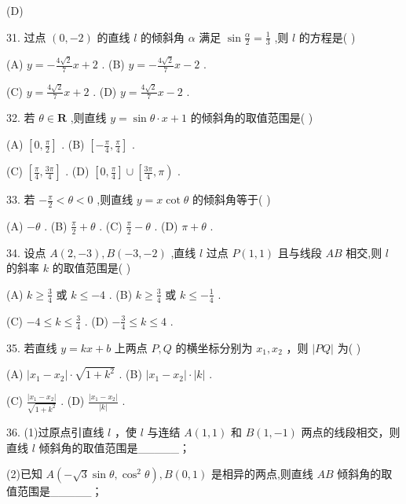 \documentclass[10pt]{article}
\begin{document}
(D)

31. 过点 \(\left( {0, - 2}\right)\) 的直线 \(l\) 的倾斜角 \(\alpha\) 满足 \(\sin \frac{\alpha }{2} = \frac{1}{3}\) ,则 \(l\) 的方程是( )

(A) \(y =  - \frac{4\sqrt{2}}{7}x + 2\) . (B) \(y =  - \frac{4\sqrt{2}}{7}x - 2\) .

(C) \(y = \frac{4\sqrt{2}}{7}x + 2\) . (D) \(y = \frac{4\sqrt{2}}{7}x - 2\) .

32. 若 \(\theta  \in  \mathbf{R}\) ,则直线 \(y = \sin \theta  \cdot  x + 1\) 的倾斜角的取值范围是( )

(A) \(\left\lbrack  {0,\frac{\pi }{2}}\right\rbrack\) . (B) \(\left\lbrack  {-\frac{\pi }{4},\frac{\pi }{4}}\right\rbrack\) .

(C) \(\left\lbrack  {\frac{\pi }{4},\frac{3\pi }{4}}\right\rbrack\) . (D) \(\left\lbrack  {0,\frac{\pi }{4}}\right\rbrack   \cup  \left\lbrack  {\frac{3\pi }{4},\pi }\right)\) .

33. 若 \(- \frac{\pi }{2} < \theta  < 0\) ,则直线 \(y = x\cot \theta\) 的倾斜角等于( )

(A) \(- \theta\) . (B) \(\frac{\pi }{2} + \theta\) . (C) \(\frac{\pi }{2} - \theta\) . (D) \(\pi  + \theta\) .

34. 设点 \(A\left( {2, - 3}\right) ,B\left( {-3, - 2}\right)\) ,直线 \(l\) 过点 \(P\left( {1,1}\right)\) 且与线段 \({AB}\) 相交,则 \(l\) 的斜率 \(k\) 的取值范围是( )

(A) \(k \geq  \frac{3}{4}\) 或 \(k \leq   - 4\) . (B) \(k \geq  \frac{3}{4}\) 或 \(k \leq   - \frac{1}{4}\) .

(C) \(- 4 \leq  k \leq  \frac{3}{4}\) . (D) \(- \frac{3}{4} \leq  k \leq  4\) .

35. 若直线 \(y = {kx} + b\) 上两点 \(P,Q\) 的横坐标分别为 \({x}_{1},{x}_{2}\) ，则 \(\left| {PQ}\right|\) 为( )

(A) \(\left| {{x}_{1} - {x}_{2}}\right|  \cdot  \sqrt{1 + {k}^{2}}\) . (B) \(\left| {{x}_{1} - {x}_{2}}\right|  \cdot  \left| k\right|\) .

(C) \(\frac{\left| {x}_{1} - {x}_{2}\right| }{\sqrt{1 + {k}^{2}}}\) . (D) \(\frac{\left| {x}_{1} - {x}_{2}\right| }{\left| k\right| }\) .

36. (1)过原点引直线 \(l\) ，使 \(l\) 与连结 \(A\left( {1,1}\right)\) 和 \(B\left( {1, - 1}\right)\) 两点的线段相交，则直线 \(l\) 倾斜角的取值范围是\_\_\_\_\_；

(2)已知 \(A\left( {-\sqrt{3}\sin \theta ,{\cos }^{2}\theta }\right) ,B\left( {0,1}\right)\) 是相异的两点,则直线 \({AB}\) 倾斜角的取值范围是\_\_\_\_\_；
\end{document}
